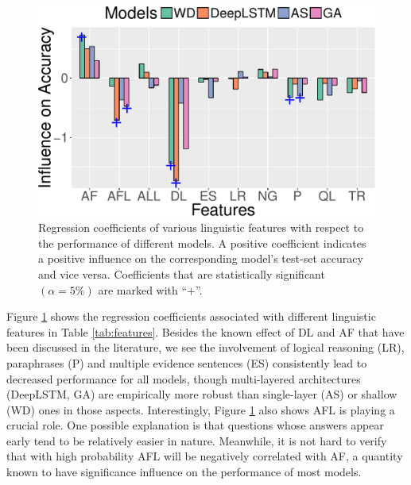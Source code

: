 \documentclass[11pt,a4paper]{article}
\begin{document}
\begin{figure}[t]
\centering
\includegraphics[width=0.9\linewidth]{regression.pdf}
\caption{Regression coefficients of various linguistic features with respect to the performance of different models. A positive coefficient indicates a positive influence on the corresponding model's test-set accuracy and vice versa. Coefficients that are statistically significant $(\alpha= 5\%)$ are marked with ``$+$''.}
\label{fig:regression}
\end{figure}

Figure \ref{fig:regression} shows the regression coefficients associated with different linguistic features in Table \ref{tab:features}.
Besides the known effect of DL and AF that have been discussed in the literature, we see the involvement of logical reasoning (LR), paraphrases (P) and multiple evidence sentences (ES) consistently lead to decreased performance for all models,
though multi-layered architectures (DeepLSTM, GA) are empirically more robust than single-layer (AS) or shallow (WD) ones in those aspects. 
Interestingly, Figure \ref{fig:regression} also shows AFL is playing a crucial role.
One possible explanation is that questions whose answers appear early tend to be relatively easier in nature.
Meanwhile,
it is not hard to verify that with high probability AFL will be negatively correlated with AF, a quantity known to have significance influence on the performance of most models.
\fi
\end{document}
